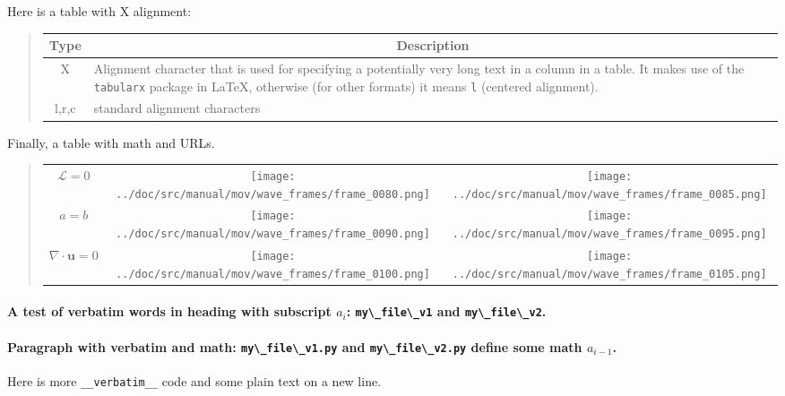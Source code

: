\documentclass[%
oneside,                 %
final,                   %
10pt]{article}
\theoremstyle{definition}
\begin{document}
\begin{enumerate}
\noindent
Here is a table with X alignment:


\begin{quote}
\begin{tabularx}{\linewidth}{cX}
\hline
\multicolumn{1}{c}{ Type } & \multicolumn{1}{c}{ Description } \\
\hline
X     & Alignment character that is used for specifying a potentially very long text in a column in a table. It makes use of the \texttt{tabularx} package in {\LaTeX}, otherwise (for other formats) it means \texttt{l} (centered alignment). \\
l,r,c & standard alignment characters                                                                                                                                                                                                       \\
\hline
\end{tabularx}
\end{quote}

\noindent
Finally, a table with math
and URLs.



\begin{quote}
\begin{tabular}{ccc}
\hline
 \\
\hline
$\mathcal{L}=0$         & \texttt{[image: ../doc/src/manual/mov/wave\_frames/frame\_0080.png]} & \texttt{[image: ../doc/src/manual/mov/wave\_frames/frame\_0085.png]} \\
$a=b$                   & \texttt{[image: ../doc/src/manual/mov/wave\_frames/frame\_0090.png]} & \texttt{[image: ../doc/src/manual/mov/wave\_frames/frame\_0095.png]} \\
$\nabla\cdot\bm{u} =0 $ & \texttt{[image: ../doc/src/manual/mov/wave\_frames/frame\_0100.png]} & \texttt{[image: ../doc/src/manual/mov/wave\_frames/frame\_0105.png]} \\
\hline
\end{tabular}
\end{quote}

\noindent
\paragraph{A test of verbatim words in heading with subscript $a_i$: \protect\Verb!my\_file\_v1! and \protect\Verb!my\_file\_v2!.}
\paragraph{Paragraph with verbatim and math: \protect\Verb!my\_file\_v1.py! and \protect\Verb!my\_file\_v2.py! define some math $a_{i-1}$.}
Here is more \Verb!__verbatim__! code and
some plain text on a new line.


\end{enumerate}
\end{document}
